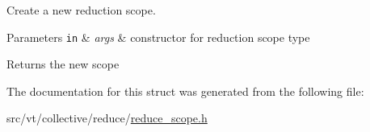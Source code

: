 Create a new reduction scope. 


\begin{DoxyParams}[1]{Parameters}
\mbox{\tt in}  & {\em args} & constructor for reduction scope type\\
\hline
\end{DoxyParams}
\begin{DoxyReturn}{Returns}
the new scope 
\end{DoxyReturn}


The documentation for this struct was generated from the following file\+:\begin{DoxyCompactItemize}
\item 
src/vt/collective/reduce/\hyperlink{reduce__scope_8h}{reduce\+\_\+scope.\+h}\end{DoxyCompactItemize}
